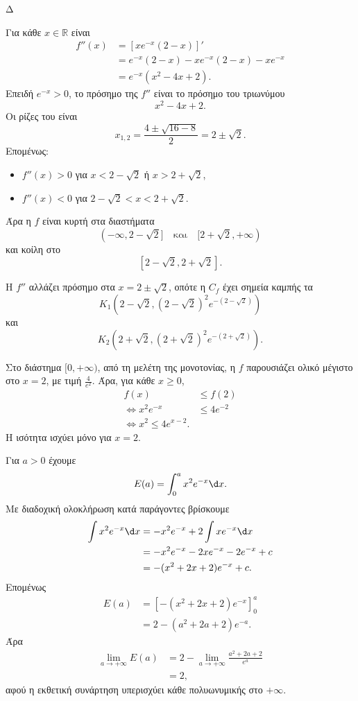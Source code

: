 \begin{thema}{Δ}
\begin{erwthma}
\item Για κάθε $x\in\mathbb{R}$ είναι
\begin{align*}
f''(x)
&=\left[xe^{-x}(2-x)\right]'\\
&=e^{-x}(2-x)-xe^{-x}(2-x)-xe^{-x}\\
&=e^{-x}(x^2-4x+2).
\end{align*}
Επειδή $e^{-x}>0$, το πρόσημο της $f''$ είναι το πρόσημο του τριωνύμου
\[
x^2-4x+2.
\]
Οι ρίζες του είναι
\[
x_{1,2}=\frac{4\pm\sqrt{16-8}}{2}=2\pm\sqrt{2}.
\]
Επομένως:
\begin{itemize}
\item $f''(x)>0$ για $x<2-\sqrt{2}$ ή $x>2+\sqrt{2}$,
\item $f''(x)<0$ για $2-\sqrt{2}<x<2+\sqrt{2}$.
\end{itemize}
Άρα η $f$ είναι κυρτή στα διαστήματα
\[
(-\infty,2-\sqrt{2}]
\quad\text{και}\quad
[2+\sqrt{2},+\infty)
\]
και κοίλη στο
\[
[2-\sqrt{2},2+\sqrt{2}].
\]

Η $f''$ αλλάζει πρόσημο στα $x=2\pm\sqrt{2}$, οπότε η $C_f$ έχει σημεία καμπής τα
\[
{K_1\left(2-\sqrt{2},(2-\sqrt{2})^2e^{-(2-\sqrt{2})}\right)}
\]
και
\[
{K_2\left(2+\sqrt{2},(2+\sqrt{2})^2e^{-(2+\sqrt{2})}\right)}.
\]

\item Στο διάστημα $[0,+\infty)$, από τη μελέτη της μονοτονίας, η $f$ παρουσιάζει ολικό μέγιστο στο $x=2$, με τιμή $\frac{4}{e^2}$. Άρα, για κάθε $x\geq0$,
\begin{align*}
f(x)&\leq f(2)\\
\Leftrightarrow x^2e^{-x}&\leq4e^{-2}\\
\Leftrightarrow {x^2\leq4e^{x-2}}.
\end{align*}
Η ισότητα ισχύει μόνο για $x=2$.

\item Για $a>0$ έχουμε
\[
E(a)=\int_0^a x^2e^{-x}\d x.
\]
Με διαδοχική ολοκλήρωση κατά παράγοντες βρίσκουμε
\begin{align*}
\int x^2e^{-x}\d x
&=-x^2e^{-x}+2\int xe^{-x}\d x\\
&=-x^2e^{-x}-2xe^{-x}-2e^{-x}+c\\
&=-(x^2+2x+2)e^{-x}+c.
\end{align*}
Επομένως
\begin{align*}
E(a)
&=\left[-(x^2+2x+2)e^{-x}\right]_0^a\\
&=2-(a^2+2a+2)e^{-a}.
\end{align*}
Άρα
\begin{align*}
\lim_{a\to+\infty}E(a)
&=2-\lim_{a\to+\infty}\frac{a^2+2a+2}{e^a}\\
&={2},
\end{align*}
αφού η εκθετική συνάρτηση υπερισχύει κάθε πολυωνυμικής στο $+\infty$.
\end{erwthma}
\end{thema}

